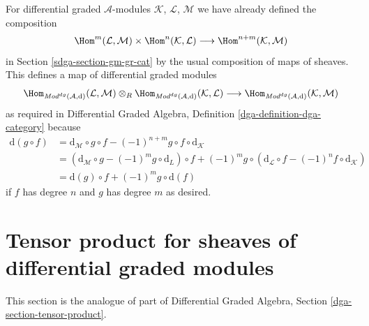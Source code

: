 \medskip\noindent
For differential graded $\mathcal{A}$-modules
$\mathcal{K}$, $\mathcal{L}$, $\mathcal{M}$
we have already defined the composition
$$
\Hom^m(\mathcal{L}, \mathcal{M}) \times
\Hom^n(\mathcal{K}, \mathcal{L}) \longrightarrow
\Hom^{n + m}(\mathcal{K}, \mathcal{M})
$$
in Section \ref{sdga-section-gm-gr-cat} by the usual composition
of maps of sheaves. This defines a map of differential graded modules
$$
\Hom_{\textit{Mod}^{dg}(\mathcal{A}, \text{d})}(\mathcal{L}, \mathcal{M})
\otimes_R
\Hom_{\textit{Mod}^{dg}(\mathcal{A}, \text{d})}(\mathcal{K}, \mathcal{L})
\longrightarrow
\Hom_{\textit{Mod}^{dg}(\mathcal{A}, \text{d})}(\mathcal{K}, \mathcal{M})
$$
as required in
Differential Graded Algebra, Definition \ref{dga-definition-dga-category}
because
\begin{align*}
\text{d}(g \circ f) & =
\text{d}_\mathcal{M} \circ g \circ f
- (-1)^{n + m} g \circ f \circ \text{d}_\mathcal{K} \\
& =
\left(\text{d}_\mathcal{M} \circ g - (-1)^m g \circ \text{d}_L\right) \circ f
+ (-1)^m g \circ \left(\text{d}_\mathcal{L} \circ f
- (-1)^n f \circ \text{d}_\mathcal{K}\right) \\
& =
\text{d}(g) \circ f + (-1)^m g \circ \text{d}(f)
\end{align*}
if $f$ has degree $n$ and $g$ has degree $m$ as desired.

\section{Tensor product for sheaves of differential graded modules}
\label{sdga-section-tensor-product-dg}
This section is the analogue of part of
Differential Graded Algebra, Section \ref{dga-section-tensor-product}.

